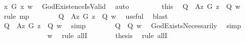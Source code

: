 \begin{isabellebody}
\ {\isachardoublequoteopen}{\isasymexists}x{\isachardot}\ G\ x\ w{\isachardoublequoteclose}\ \isamarkupfalse%
\ GodExistenceIsValid\ \isamarkupfalse%
\ auto\isanewline
\ \ \ \ \ \ \isamarkupfalse%
\ {}\ this\ \isamarkupfalse%
\ {\isachardoublequoteopen}{\isacharparenleft}Q\ \isactrlbold {\isasymrightarrow}\ \isactrlbold {\isasymbox}{\isacharparenleft}\isactrlbold {\isasymforall}\isactrlsup Az{\isachardot}\ G\ z\ \isactrlbold {\isasymrightarrow}\ Q{\isacharparenright}{\isacharparenright}\ w{\isachardoublequoteclose}\ \isamarkupfalse%
\ {\isacharparenleft}rule\ mp{\isacharparenright}\isanewline
\ \ \ \ \ \ \isamarkupfalse%
\ {\isachardoublequoteopen}{\isacharparenleft}Q\ \isactrlbold {\isasymrightarrow}\ \isactrlbold {\isasymbox}{\isacharparenleft}{\isacharparenleft}\isactrlbold {\isasymexists}\isactrlsup Az{\isachardot}\ G\ z{\isacharparenright}\ \isactrlbold {\isasymrightarrow}\ Q{\isacharparenright}{\isacharparenright}\ w{\isachardoublequoteclose}\ \isamarkupfalse%
\ useful\ \isamarkupfalse%
\ blast\isanewline
\ \ \ \ \ \ \isamarkupfalse%
\ {\isachardoublequoteopen}{\isacharparenleft}Q\ \isactrlbold {\isasymrightarrow}\ {\isacharparenleft}\isactrlbold {\isasymbox}{\isacharparenleft}\isactrlbold {\isasymexists}\isactrlsup Az{\isachardot}\ G\ z{\isacharparenright}\ \isactrlbold {\isasymrightarrow}\ \isactrlbold {\isasymbox}Q{\isacharparenright}{\isacharparenright}\ w{\isachardoublequoteclose}\ \isamarkupfalse%
\ simp\isanewline
\ \ \ \ \ \ \isamarkupfalse%
\ {\isachardoublequoteopen}{\isacharparenleft}Q\ \isactrlbold {\isasymrightarrow}\ \isactrlbold {\isasymbox}Q{\isacharparenright}\ w{\isachardoublequoteclose}\ \isamarkupfalse%
\ GodExistsNecessarily\ \isamarkupfalse%
\ simp\isanewline
\ \ \ \ \ \isacommand{{\isacharbraceright}}\isamarkupfalse%
\ \isamarkupfalse%
\ {\isachardoublequoteopen}{\isacharparenleft}\isactrlbold {\isasymforall}{\isasymPhi}{\isachardot}\ {\isasymPhi}\ \isactrlbold {\isasymrightarrow}\ \isactrlbold {\isasymbox}\ {\isasymPhi}{\isacharparenright}\ w{\isachardoublequoteclose}\ \isamarkupfalse%
\ {\isacharparenleft}rule\ allI{\isacharparenright}\isanewline
\ \ \ \ \isacommand{{\isacharbraceright}}\isamarkupfalse%
\ \isamarkupfalse%
\ {\isacharquery}thesis\ \isamarkupfalse%
\ {\isacharparenleft}rule\ allI{\isacharparenright}\isanewline
\ \ \isamarkupfalse%
%
%
%
%
%
%
%
%
%
%
\end{isabellebody}%
